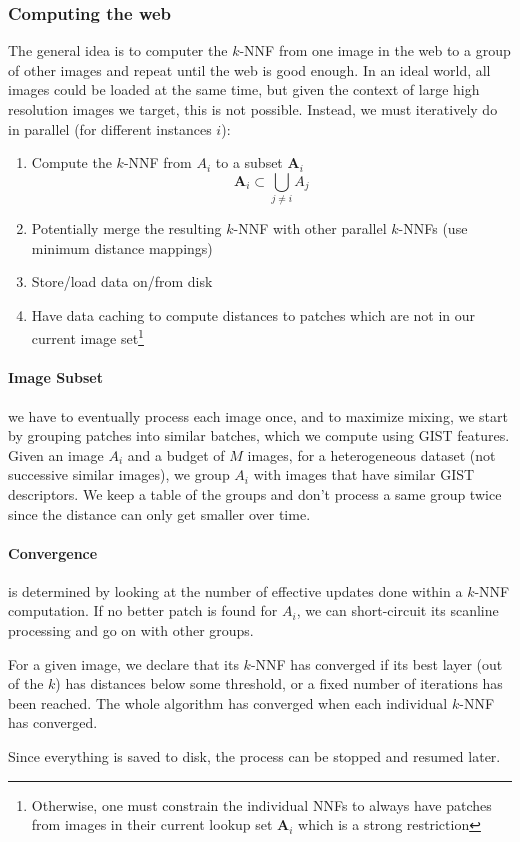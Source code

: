 \subsubsection{Computing the web}
The general idea is to computer the $k$-NNF from one image in the web to a group of other images and repeat until the web is good enough.
In an ideal world, all images could be loaded at the same time, but given the context of large high resolution images we target, this is not possible.
Instead, we must iteratively do in parallel (for different instances $i$):
\begin{enumerate}
	\item Compute the $k$-NNF from $A_i$ to a subset $\mathbf{A}_i$
	\[ 
		\mathbf{A}_i \subset \bigcup_{j\neq i}{A_j}
	\]
	\item Potentially merge the resulting $k$-NNF with other parallel $k$-NNFs (use minimum distance mappings)
	\item Store/load data on/from disk
	\item Have data caching to compute distances to patches which are not in our current image set\footnote{Otherwise, one must constrain the individual NNFs to always have patches from images in their current lookup set $\mathbf{A}_i$ which is a strong restriction}
\end{enumerate}

\paragraph{Image Subset} we have to eventually process each image once, and to maximize mixing, we start by grouping patches into similar batches, which we compute using GIST features.
Given an image $A_i$ and a budget of $M$ images, for a heterogeneous dataset (not successive similar images), we group $A_i$ with images that have similar GIST descriptors.
We keep a table of the groups and don't process a same group twice since the distance can only get smaller over time.

\paragraph{Convergence} is determined by looking at the number of effective updates done within a $k$-NNF computation.
If no better patch is found for $A_i$, we can short-circuit its scanline processing and go on with other groups.

For a given image, we declare that its $k$-NNF has converged if its best layer (out of the $k$) has distances below some threshold, or a fixed number of iterations has been reached.
The whole algorithm has converged when each individual $k$-NNF has converged.

Since everything is saved to disk, the process can be stopped and resumed later.